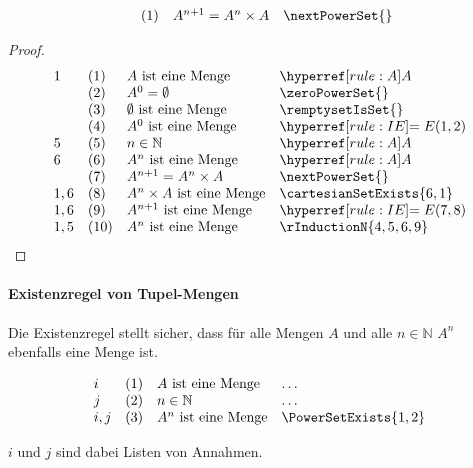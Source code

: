 \documentclass[main.tex]{subfiles}
\begin{document}
\[
\begin{array}{llll}
	& (1) & A^{n+1}=A^n\times A & \nextPowerSet{} \\
\end{array}
\]

\begin{theorem}
\end{theorem}
\begin{proof}
	\[
	\begin{array}{llll}
		  1 &  (1) & A \text{ ist eine Menge} & \rA{} \\
            &  (2) & A^0=\emptyset & \zeroPowerSet{} \\
            &  (3) & \emptyset \text{ ist eine Menge} & \remptysetIsSet{} \\
            &  (4) & A^0 \text{ ist eine Menge} & \rIE{1,2} \\
            5 &  (5) & n\in\mathbb{N} & \rA \\
            6 &  (6) & A^n \text{ ist eine Menge} & \rA \\
              &  (7) & A^{n+1}=A^n\times A & \nextPowerSet{}  \\
            1,6  &  (8) & A^n\times A \text{ ist eine Menge} & \cartesianSetExists{6,1}  \\
            1,6  &  (9) & A^{n+1} \text{ ist eine Menge} & \rIE{7,8}  \\
            1,5  &  (10) & A^{n} \text{ ist eine Menge} & \rInductionN{4,5,6,9}  \\
	\end{array}
	\]
\end{proof}

\paragraph{Existenzregel von Tupel-Mengen}
\label{rule:PowerSetExists}
Die Existenzregel stellt sicher, dass für alle Mengen \(A\) und alle \(n\in\mathbb{N}\) \(A^{n}\) ebenfalls eine Menge ist.

\[
\begin{array}{llll}
	i & (1) & A \text{ ist eine Menge} & \dots  \\
        j & (2) & n\in\mathbb{N} & \dots  \\
	i,j & (3) & A^n\text{ ist eine Menge} & \PowerSetExists{1,2} \\
\end{array}
\]

\(i\) und \(j\) sind dabei Listen von Annahmen.
\end{document}
